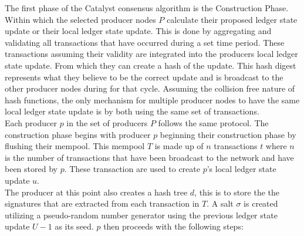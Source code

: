The first phase of the Catalyst consensus algorithm is the Construction Phase. Within which the selected producer nodes  $P$ calculate their proposed ledger state update or their local ledger state update. This is done by aggregating and validating all transactions that have occurred during a set time period. These transactions assuming their validity are integrated into the producers local ledger state update. From which they can create a hash of the update. This hash digest represents what they believe to be the correct update and is broadcast to the other producer nodes during for that cycle. Assuming the collision free nature of hash functions, the only mechanism for multiple producer nodes to have the same local ledger state update is by both using the same set of transactions. \\

Each producer $p$ in the set of producers $P$ follows the same protocol. The construction phase begins with producer $p$ beginning their construction phase by flushing their mempool. This mempool $T$ is made up of $n$ transactions $t$  where $n$ is the number of transactions that have been broadcast to the network and have been stored by $p$. These transaction are used to create $p$'s local ledger state update $u$. \\

The producer at this point also creates a hash tree $d$, this is to store the the signatures that are extracted from each transaction in $T$. A salt $\sigma$ is created utilizing a pseudo-random number generator using the previous ledger state update $U-1$ as its seed. $p$ then proceeds with the following steps:

